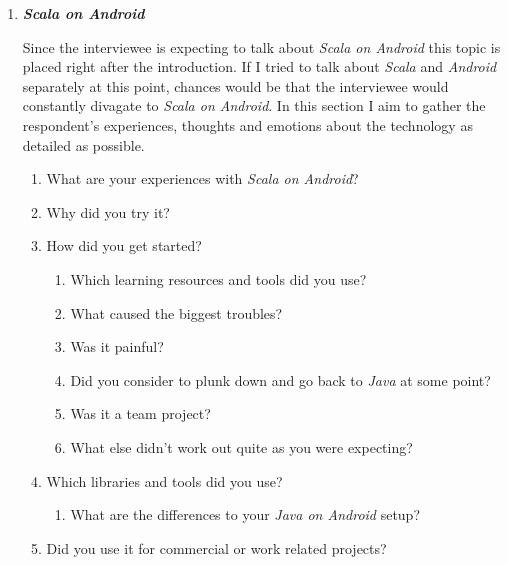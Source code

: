 \begin{enumerate}
	\item \textbf{\textit{Scala on Android}}

	Since the interviewee is expecting to talk about \textit{Scala on Android} this topic is placed right after the introduction. If I tried to talk about \textit{Scala} and \textit{Android} separately at this point, chances would be that the interviewee would constantly divagate to \textit{Scala on Android}. In this section I aim to gather the respondent's experiences, thoughts and emotions about the technology as detailed as possible.

	\begin{enumerate}

		\item What are your experiences with \textit{Scala on Android}?

		\item Why did you try it?

		\item How did you get started?

		\begin{enumerate}

			\item Which learning resources and tools did you use?

			\item What caused the biggest troubles?

			\item Was it painful?

			\item Did you consider to plunk down and go back to \textit{Java} at some point?

			\item Was it a team project?

			\item What else didn't work out quite as you were expecting?

		\end{enumerate}

		\item Which libraries and tools did you use?

		\begin{enumerate}

			\item What are the differences to your \textit{Java on Android} setup?

		\end{enumerate}

		\item Did you use it for commercial or work related projects?


\end{enumerate}
\end{enumerate}
